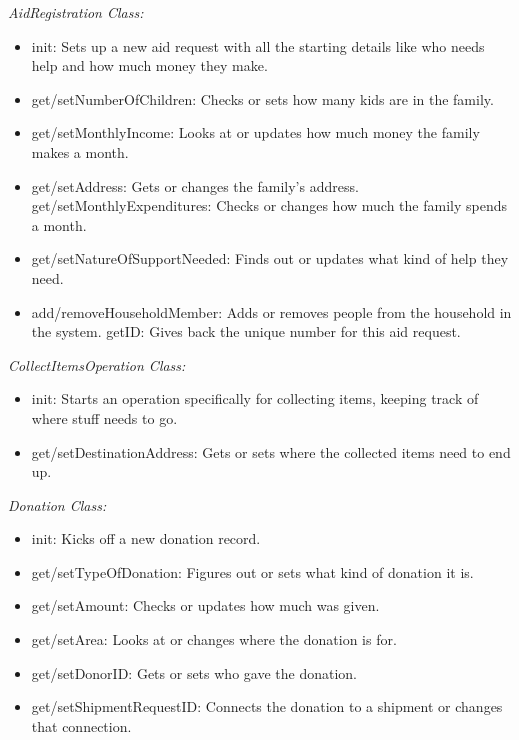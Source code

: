 \documentclass[a4paper,12pt]{report}
\begin{document}
				\textit{AidRegistration Class:} 
			\begin{itemize}
				
		\item	init: Sets up a new aid request with all the starting details like who needs help and how much money they make.
		\item	get/setNumberOfChildren: Checks or sets how many kids are in the family.
		\item	get/setMonthlyIncome: Looks at or updates how much money the family makes a month.
		\item get/setAddress: Gets or changes the family's address.
			get/setMonthlyExpenditures: Checks or changes how much the family spends a month.
		\item	get/setNatureOfSupportNeeded: Finds out or updates what kind of help they need.
	        \item add/removeHouseholdMember: Adds or removes people from the household in the system.
			getID: Gives back the unique number for this aid request.
			
		\end{itemize}
				\textit{CollectItemsOperation Class:} 
				\begin{itemize}
					
				 \item	init: Starts an operation specifically for collecting items, keeping track of where stuff needs to go.
				 \item	get/setDestinationAddress: Gets or sets where the collected items need to end up.
					
				\end{itemize}
				
				\textit{Donation Class:} 
				\begin{itemize}
					
				\item	init: Kicks off a new donation record.
				\item	get/setTypeOfDonation: Figures out or sets what kind of donation it is.
				\item	get/setAmount: Checks or updates how much was given.
				\item	get/setArea: Looks at or changes where the donation is for.
				\item	get/setDonorID: Gets or sets who gave the donation.
				\item	get/setShipmentRequestID: Connects the donation to a shipment or changes that connection.
					
				\end{itemize}
			
\end{document}
